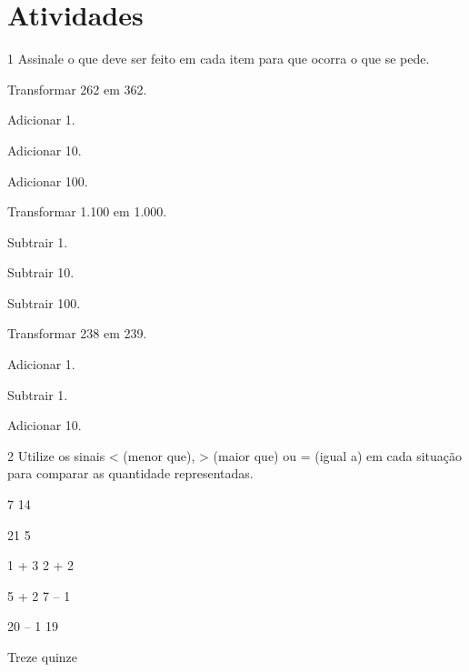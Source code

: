 \section*{Atividades}

\num{1} Assinale o que deve ser feito em cada item para que ocorra o que se pede.


\begin{escolha}

\item
  Transformar 262 em 362.

\begin{boxlist}
 Adicionar 1.

 Adicionar 10.

 Adicionar 100.
\end{boxlist}

\item
  Transformar 1.100 em 1.000.

\begin{boxlist}
 Subtrair 1.

 Subtrair 10.

 Subtrair 100.
\end{boxlist}


\item
  Transformar 238 em 239.

\begin{boxlist}
 Adicionar 1.

 Subtrair 1.

 Adicionar 10.
\end{boxlist}

\end{escolha}

\num{2} Utilize os sinais \textless{} (menor que), \textgreater{} (maior que) ou
= (igual a) em cada situação para comparar as quantidade representadas.\bigskip

\begin{minipage}{.5\textwidth}
\begin{escolha}
\item
  7  14
\item
  21  5
\item
  1 + 3  2 + 2
  \end{escolha}
  \end{minipage}
\begin{minipage}{.5\textwidth}
  \begin{escolha}[start=4]
\item
  5 + 2  7 -- 1
\item
  20 -- 1  19
\item
  Treze  quinze
\end{escolha}
\end{minipage}


